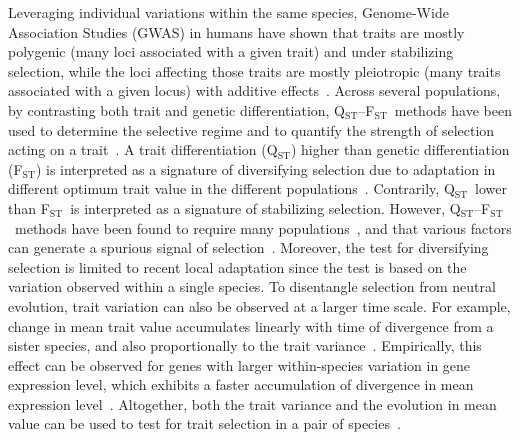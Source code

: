 \documentclass{article}
\newcommand{\Qst}{Q$_\text{ST}$}
\newcommand{\Fst}{F$_\text{ST}$}
\newcommand{\QstFst}{\Qst--\Fst}
\begin{document}
Leveraging individual variations within the same species, Genome-Wide Association Studies (GWAS) in humans have shown that traits are mostly polygenic (many loci associated with a given trait) and under stabilizing selection, while the loci affecting those traits are mostly pleiotropic (many traits associated with a given locus) with additive effects~\parencite{simons_population_2018, sella_thinking_2019}. 
Across several populations, by contrasting both trait and genetic differentiation, \QstFst\ methods have been used to determine the selective regime and to quantify the strength of selection acting on a trait~\parencite{merila_comparison_2001, leinonen_comparative_2008}.
A trait differentiation (\Qst) higher than genetic differentiation (\Fst) is interpreted as a signature of diversifying selection due to adaptation in different optimum trait value in the different populations~\parencite{lamy_qst_2012}.
Contrarily, \Qst\ lower than \Fst\ is interpreted as a signature of stabilizing selection.
However, \QstFst\ methods have been found to require many populations~\parencite{ohara_bias_2005}, and that various factors can generate a spurious signal of selection~\parencite{pujol_are_2008, edelaar_comparisons_2011}.
Moreover, the test for diversifying selection is limited to recent local adaptation since the test is based on the variation observed within a single species.
To disentangle selection from neutral evolution, trait variation can also be observed at a larger time scale.
For example, change in mean trait value accumulates linearly with time of divergence from a sister species, and also proportionally to the trait variance~\parencite{lande_genetic_1980, turelli_heritable_1984}. %
Empirically, this effect can be observed for genes with larger within-species variation in gene expression level, which exhibits a faster accumulation of divergence in mean expression level~\parencite{khaitovich_neutral_2004}.
Altogether, both the trait variance and the evolution in mean value can be used to test for trait selection in a pair of species~\parencite{walsh_evolution_2018}.
\end{document}

